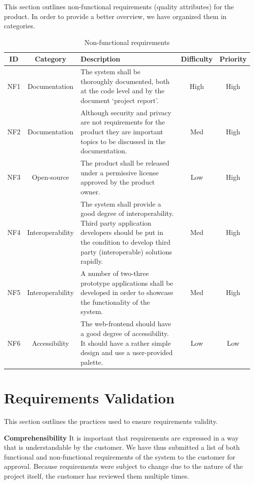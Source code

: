 This section outlines non-functional requirements (quality attributes) for the product.
In order to provide a better overview, we have organized them in categories.

\begin{table}[H]
\begin{center}
\begin{tabular}{ | c | c |p{6.5cm} | c | c |}
  \hline
  ID & Category & Description & Difficulty & Priority\\
  \hline\noalign{\smallskip}\noalign{\smallskip}\hline
  NF1 & Documentation & The system shall be thoroughly documented, both at the code level and by the document ‘project report’.
  & High & High \\
  NF2 & Documentation & Although security and privacy are not requirements for the product they are important topics to be discussed in the documentation.
  & Med & High \\
  NF3 & Open-source	& The product shall be released under a permissive license approved by the product owner.
  & Low & High \\
  NF4 & Interoperability & The system shall provide a good degree of interoperability. Third party application developers should be put in the condition to develop third party (interoperable) solutions rapidly.
  & Med & High \\
  NF5 & Interoperability & A number of two-three prototype applications shall be developed in order to showcase the functionality of the system.
  & Med & High \\
  NF6 & Accessibility & The web-frontend should have a good degree of accessibility. It should have a rather simple design and use a user-provided palette.
  & Low & Low \\
  \hline
\end{tabular}
\end{center}
\caption{Non-functional requirements}
\label{table:reqnonfunc}
\end{table}


\section{Requirements Validation}
This section outlines the practices used to ensure requirements validity.

\textbf{Comprehensibility}\newline
It is important that requirements are expressed in a way that is understandable by the customer.
We have thus submitted a list of both functional and non-functional requirements of the system
to the customer for approval. Because requirements were subject to change due to the nature of the project
itself, the customer has reviewed them multiple times.

